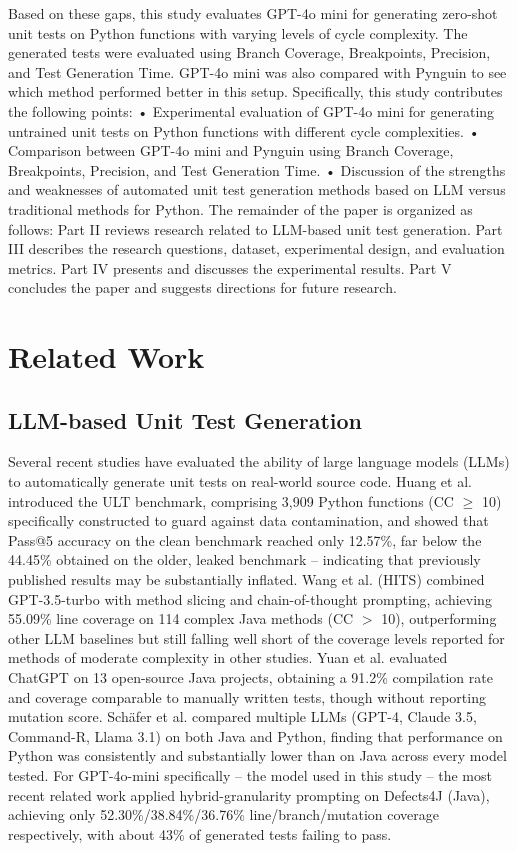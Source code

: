 \documentclass[conference]{IEEEtran}
\begin{document}
Based on these gaps, this study evaluates GPT-4o mini for generating zero-shot unit tests on Python functions with varying levels of cycle complexity. The generated tests were evaluated using Branch Coverage, Breakpoints, Precision, and Test Generation Time. GPT-4o mini was also compared with Pynguin to see which method performed better in this setup. Specifically, this study contributes the following points:
•	Experimental evaluation of GPT-4o mini for generating untrained unit tests on Python functions with different cycle complexities.
•	Comparison between GPT-4o mini and Pynguin using Branch Coverage, Breakpoints, Precision, and Test Generation Time.
•	Discussion of the strengths and weaknesses of automated unit test generation methods based on LLM versus traditional methods for Python.
The remainder of the paper is organized as follows: Part II reviews research related to LLM-based unit test generation. Part III describes the research questions, dataset, experimental design, and evaluation metrics. Part IV presents and discusses the experimental results. Part V concludes the paper and suggests directions for future research.
\section{Related Work}
\label{sec:related}
\subsection{LLM-based Unit Test Generation}
\label{subsec:related-llm}
Several recent studies have evaluated the ability of large language models (LLMs) to automatically generate unit tests on real-world source code. Huang et al. \cite{b12} introduced the ULT benchmark, comprising 3,909 Python functions (CC $\geq$ 10) specifically constructed to guard against data contamination, and showed that Pass@5 accuracy on the clean benchmark reached only 12.57\%, far below the 44.45\% obtained on the older, leaked benchmark -- indicating that previously published results may be substantially inflated. Wang et al. \cite{b13} (HITS) combined GPT-3.5-turbo with method slicing and chain-of-thought prompting, achieving 55.09\% line coverage on 114 complex Java methods (CC $>$ 10), outperforming other LLM baselines but still falling well short of the coverage levels reported for methods of moderate complexity in other studies. Yuan et al. \cite{b14} evaluated ChatGPT on 13 open-source Java projects, obtaining a 91.2\% compilation rate and coverage comparable to manually written tests, though without reporting mutation score. Sch\"afer et al. \cite{b15} compared multiple LLMs (GPT-4, Claude 3.5, Command-R, Llama 3.1) on both Java and Python, finding that performance on Python was consistently and substantially lower than on Java across every model tested. For GPT-4o-mini specifically -- the model used in this study -- the most recent related work \cite{b16} applied hybrid-granularity prompting on Defects4J (Java), achieving only 52.30\%/38.84\%/36.76\% line/branch/mutation coverage respectively, with about 43\% of generated tests failing to pass.
\end{document}
